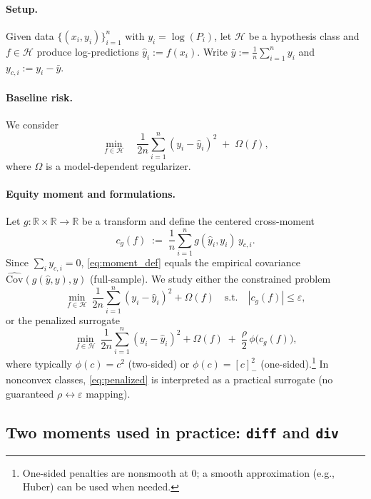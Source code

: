 \documentclass[11pt]{article}
\theoremstyle{plain}
\theoremstyle{definition}
\newcommand{\1}{\mathbf{1}}
\begin{document}
\paragraph{Setup.}
Given data $\{(x_i,y_i)\}_{i=1}^n$ with $y_i=\log(P_i)$, let $\mathcal H$ be a hypothesis class and
$f\in\mathcal H$ produce log-predictions $\hat y_i:=f(x_i)$.
Write $\bar y:=\frac1n\sum_{i=1}^n y_i$ and $y_{c,i}:=y_i-\bar y$.

\paragraph{Baseline risk.}
We consider
\begin{equation}
\label{eq:base_obj}
\min_{f\in\mathcal H}\quad
\frac{1}{2n}\sum_{i=1}^n (y_i-\hat y_i)^2 \;+\;\Omega(f),
\end{equation}
where $\Omega$ is a model-dependent regularizer.

\paragraph{Equity moment and formulations.}
Let $g:\mathbb R\times\mathbb R\to\mathbb R$ be a transform and define the centered cross-moment
\begin{equation}
\label{eq:moment_def}
c_g(f)\;:=\;\frac{1}{n}\sum_{i=1}^n g(\hat y_i,y_i)\,y_{c,i}.
\end{equation}
Since $\sum_i y_{c,i}=0$, \eqref{eq:moment_def} equals the empirical covariance
$\widehat{\mathrm{Cov}}(g(\hat y,y),y)$ (full-sample).
We study either the constrained problem
\begin{equation}
\label{eq:constrained}
\min_{f\in\mathcal H}\ \frac{1}{2n}\sum_{i=1}^n (y_i-\hat y_i)^2+\Omega(f)
\quad \text{s.t.}\quad |c_g(f)|\le \varepsilon,
\end{equation}
or the penalized surrogate
\begin{equation}
\label{eq:penalized}
\min_{f\in\mathcal H}\ \frac{1}{2n}\sum_{i=1}^n (y_i-\hat y_i)^2+\Omega(f)
\;+\;\frac{\rho}{2}\,\phi\!\bigl(c_g(f)\bigr),
\end{equation}
where typically $\phi(c)=c^2$ (two-sided) or $\phi(c)=[c]_-^2$ (one-sided).\footnote{One-sided penalties
are nonsmooth at $0$; a smooth approximation (e.g., Huber) can be used when needed.}
In nonconvex classes, \eqref{eq:penalized} is interpreted as a practical surrogate (no guaranteed
$\rho\leftrightarrow\varepsilon$ mapping).

\subsection{Two moments used in practice: \texttt{diff} and \texttt{div}}
\label{sec:diff_div}
\end{document}
